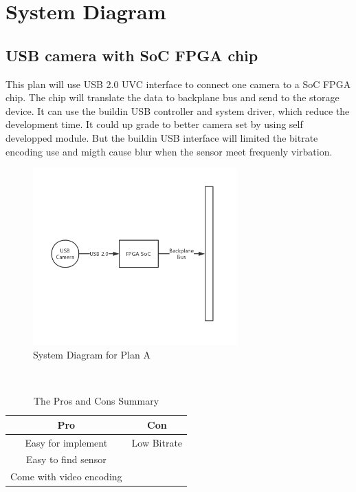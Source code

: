 \documentclass[12pt,article]{memoir}
\begin{document}
\chapter{System Diagram}
\section{USB camera with SoC FPGA chip}
This plan will use USB 2.0 UVC interface to connect one camera to a SoC FPGA chip. The chip will translate the data to backplane bus and send to the storage device. It can use the buildin USB controller and system driver, which reduce the development time. It could up grade to better camera set by using self developped module. But the buildin USB interface will limited the bitrate encoding use and migth cause blur when the sensor meet frequenly virbation.\\
\begin{figure}[htp]
\begin{center}
\includegraphics[width=0.7\textwidth]{img/DR00002_Plan1.png}
 \caption{System Diagram for Plan A}	
\end{center}
\end{figure}
\\
\begin{table}[H]
	\centering
		\begin{tabu}{c | c }
		Pro & Con \\ \hline
		Easy for implement & Low Bitrate \\
		Easy to find sensor &  \\
		Come with video encoding &  \\
		\end{tabu}
	\caption{The Pros and Cons Summary}
\end{table}
\newpage
\end{document}
